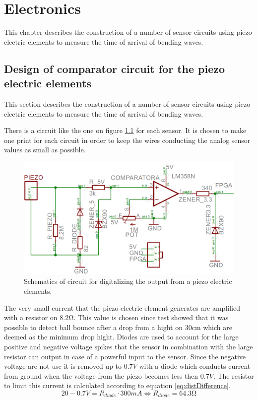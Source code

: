 \chapter{Electronics} %
\label{chap:electronics}
This chapter describes the construction of a number of sensor circuits using piezo electric elements to measure the time of arrival of bending waves.
\section{Design of comparator circuit for the piezo electric elements}
This section describes the construction of a number of sensor circuits using piezo electric elements to measure the time of arrival of bending waves.

There is a circuit like the one on figure \ref{fig:print} for each sensor. It is chosen to make one print for each circuit in order to keep the wires conducting the analog sensor values as small as possible.
\begin{figure}[htb]
	\centering
	\includegraphics[width=.8\textwidth]{figures/Print}
	\caption{Schematics of circuit for digitalizing the output from a piezo electric elements.}
	\label{fig:print}
\end{figure}
The very small current that the piezo electric element generates are amplified with a resistor on $8.2\si{\ohm}$. This value is chosen since test showed that it was possible to detect ball bounce after a drop from a hight on $30\si{\centi\meter}$ which are deemed as the minimum drop hight.
Diodes are used to account for the large positive and negative voltage spikes that the sensor in combination with the large resistor can output in case of a powerful input to the sensor.
Since the negative voltage are not use it is removed up to $0.7V$ with a diode which conducts current from ground when the voltage from the piezo becomes less then $0.7V$.
The resistor to limit this current is calculated according to equation \ref{eq:distDifference}.
\begin{equation}
20 - 0.7 V = R_{diode} \cdot 300mA \Leftrightarrow R_{diode} = 64.3\si{\ohm}
\label{diodeResistor}
\end{equation}
